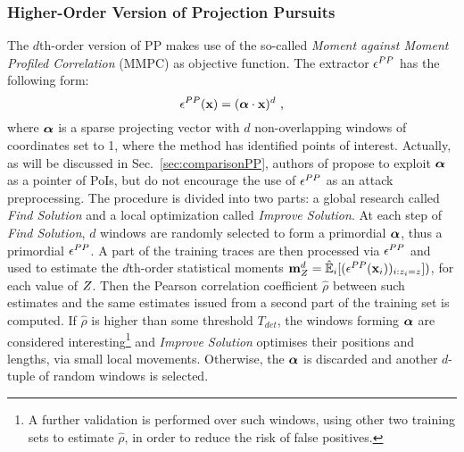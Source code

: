 %

\subsubsection{Higher-Order Version of Projection Pursuits}
The $d$th-order version of PP makes use of the so-called \emph{Moment against Moment Profiled Correlation} (MMPC) as objective function. The extractor $\epsilon^{PP}$ has the following form:
\begin{equation} 
\epsilon^{PP}(\textbf{x}) = (\boldsymbol{\alpha}\cdot\textbf{x})^d \mbox{ ,}
\end{equation}
where $\boldsymbol{\alpha}$ is a sparse projecting vector with $d$ non-overlapping windows of coordinates set to 1, where the method has identified points of interest. Actually, as will be discussed in Sec.~\ref{sec:comparisonPP}, authors of \cite{PP} propose to exploit $\boldsymbol{\alpha}$ as a pointer of PoIs, but do not encourage the use of $\epsilon^{PP}$ as an attack preprocessing. The procedure is divided into two parts: a global research called {\em Find Solution} and a local optimization called {\em Improve Solution}. At each step of {\em Find Solution}, $d$ windows are randomly selected to form a primordial $\boldsymbol{\alpha}$, thus a primordial $\epsilon^{PP}$. A part of the training traces are then processed via $\epsilon^{PP}$ and used to estimate the $d$th-order statistical moments $\textbf{m}^d_Z = \hat{\mathbb{E}}_i[(\epsilon^{PP}(\textbf{x}_i))_{i:z_i=z}])$,  for each value of $Z$. Then the Pearson correlation coefficient $\hat{\rho}$ between such estimates and the same estimates issued from a second part of the training set is computed. If $\hat{\rho}$ is higher than some threshold $T_{det}$, the windows forming $\boldsymbol{\alpha}$ are considered interesting\footnote{A further validation is performed over such windows, using other two training sets to estimate $\hat{\rho}$, in order to reduce the risk of false positives.}\label{fn:4trainingSets} and \emph{Improve Solution} optimises their positions and lengths, via small local movements. Otherwise, the $\boldsymbol{\alpha}$ is discarded and another $d$-tuple of random windows is selected.\\

